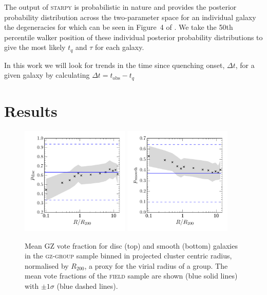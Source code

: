 \documentclass[useAMS,usenatbib]{mn2e}
\def\starpy ~{\textsc{starpy}}
\begin{document}
The output of \starpy  ~ is probabilistic in nature and provides the posterior probability distribution across the two-parameter space for an individual galaxy the degeneracies for which can be seen in Figure~4 of \citet{smethurst15}. We take the 50th percentile walker position of these individual posterior probability distributions to give the most likely $t_{q}$ and $\tau$ for each galaxy. 

In this work we will look for trends in the time since quenching onset, $\Delta t$, for a given galaxy by calculating $\Delta t = t_\mathrm{obs} - t_{q}$

\section{Results}\label{sec:results}

\begin{figure}
\includegraphics[width=0.46\textwidth]{p_disc_trend_with_log_radius_field_compare.pdf}
\includegraphics[width=0.46\textwidth]{p_smooth_trend_with_log_radius_field_compare.pdf}
\caption{Mean GZ vote fraction for disc (top) and smooth (bottom) galaxies in the \textsc{gz-group} sample binned in projected cluster centric radius, normalised by $R_{200}$, a proxy for the virial radius of a group. The mean vote fractions of the \textsc{field} sample are shown (blue solid lines) with $\pm1\sigma$ (blue dashed lines).}
\label{fig:morphradius}
\end{figure}
\end{document}
